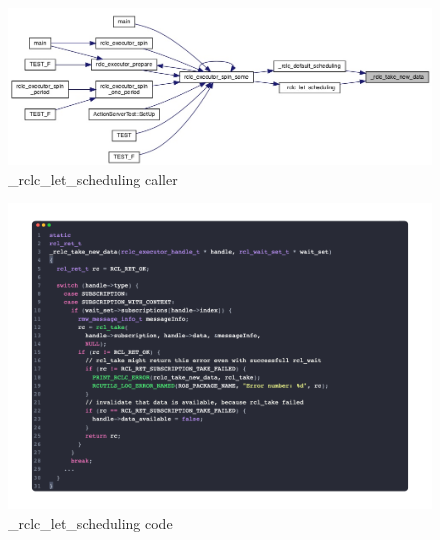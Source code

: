 \subsubsection{}
\begin{figure}[htbp!]
    \centering
    \includegraphics[width=1\linewidth]{Img/graph/rclc/take_new_data_caller.jpg}
    \caption{\_rclc\_let\_scheduling caller}
    \vspace{-0.1in}
\end{figure}

\begin{figure}[htbp!]
    \centering
    \includegraphics[width=1\linewidth]{Img/code/rclc/_rclc_tak_new_data.png}
    \caption{\_rclc\_let\_scheduling code}
    \vspace{-0.1in}
\end{figure}

